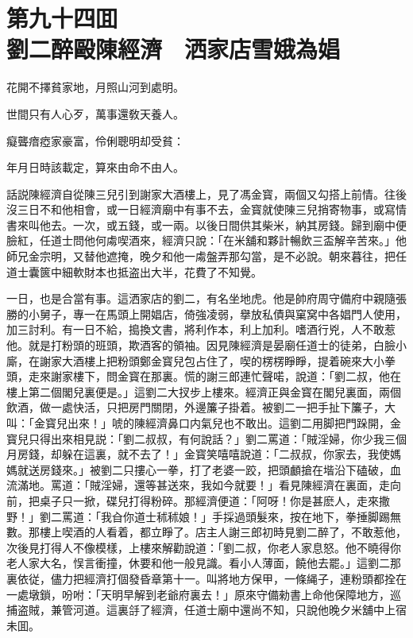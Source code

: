 
\chapter*{第九十四囬　\\劉二醉毆陳經濟　洒家店雪娥為娼}
\thispagestyle{empty}

\begin{myquote}
花開不擇貧家地，月照山河到處明。

世間只有人心歹，萬事還敎天養人。

癡聾瘖瘂家豪富，伶俐聰明却受貧：

年月日時該載定，算來由命不由人。
\end{myquote}

話説陳經濟自從陳三兒引到謝家大酒樓上，見了馮金寳，兩個又勾搭上前情。往後沒三日不和他相會，或一日經濟廟中有事不去，金寳就使陳三兒捎寄物事，或寫情書來叫他去。一次，或五錢，或一兩。以後日間供其柴米，納其房錢。歸到廟中便臉紅，任道士問他何䖏喫酒來，經濟只說：「在米舖和夥計暢飲三盃解辛苦來。」他師兄金宗明，又替他遮掩，晚夕和他一䖏盤弄那勾當，是不必說。朝來暮往，把任道士囊篋中細軟財本也抵盗出大半，花費了不知覺。

一日，也是合當有事。這洒家店的劉二，有名坐地虎。他是帥府周守備府中親隨張勝的小舅子，專一在馬頭上開娼店，倚強凌弱，擧放私債與窠窝中各娼門人使用，加三討利。有一日不給，搗換文書，將利作本，利上加利。嗜酒行兇，人不敢惹他。就是打粉頭的班頭，欺酒客的領袖。因見陳經濟是晏廟任道士的徒弟，白臉小廝，在謝家大酒樓上把粉頭鄭金寳兒包占住了，喫的楞楞睜睜，提着碗來大小拳頭，走來謝家樓下，問金寳在那裏。慌的謝三郎連忙聲喏，說道：「劉二叔，他在樓上第二個閣兒裏便是。」這劉二大扠步上樓來。經濟正與金寳在閣兒裏面，兩個飲酒，做一處快活，只把房門關閉，外邊簾子掛着。被劉二一把手扯下簾子，大叫：「金寳兒出來！」唬的陳經濟鼻口内氣兒也不敢出。這劉二用脚把門跺開，金寳兒只得出來相見説：「劉二叔叔，有何說話？」劉二罵道：「賊淫婦，你少我三個月房錢，却躲在這裏，就不去了！」金寳笑嘻嘻說道：「二叔叔，你家去，我使媽媽就送房錢來。」被劉二只摟心一拳，打了老婆一跤，把頭顱搶在堦沿下磕破，血流滿地。罵道：「賊淫婦，還等甚送來，我如今就要！」看見陳經濟在裏面，走向前，把桌子只一掀，碟兒打得粉碎。那經濟便道：「阿呀！你是甚麽人，走來撒野！」劉二罵道：「我㒲你道士秫秫娘！」手採過頭髮來，按在地下，拳捶脚踢無數。那樓上喫酒的人看着，都立睜了。店主人謝三郎初時見劉二醉了，不敢惹他，次後見打得人不像模樣，上樓來解勸說道：「劉二叔，你老人家息怒。他不曉得你老人家大名，悮言衝撞，休要和他一般見識。看小人薄面，饒他去罷。」這劉二那裏依従，儘力把經濟打個發昏章第十一。叫將地方保甲，一條䋲子，連粉頭都拴在一處墩鎖，吩咐：「天明早解到老爺府裏去！」原來守備勑書上命他保障地方，巡捕盗賊，兼管河道。這裏㧱了經濟，任道士廟中還尚不知，只說他晚夕米舖中上宿未囬。

